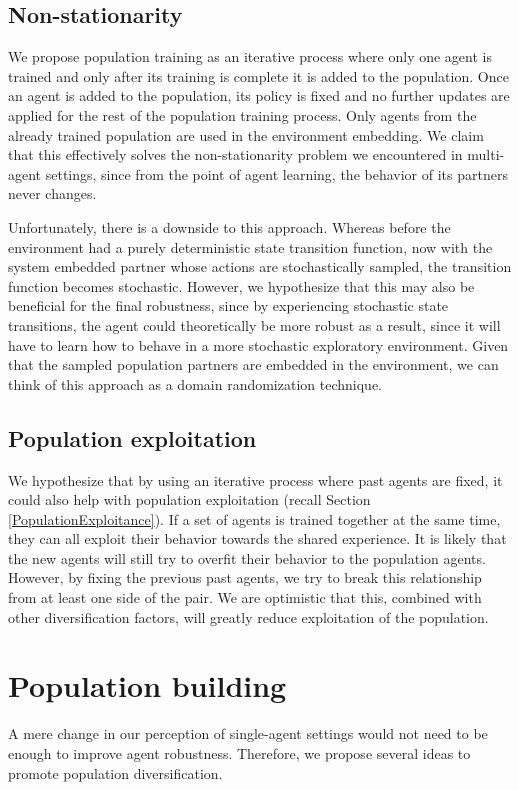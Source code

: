 \subsection{Non-stationarity}
We propose population training as an iterative process where only one agent is trained and only after its training is complete it is added to the population.
Once an agent is added to the population, its policy is fixed and no further updates are applied for the rest of the population training process.
Only agents from the already trained population are used in the environment embedding.
We claim that this effectively solves the non-stationarity problem we encountered in multi-agent settings, since from the point of agent learning, the behavior of its partners never changes.

Unfortunately, there is a downside to this approach.
Whereas before the environment had a purely deterministic state transition function, now with the system embedded partner whose actions are stochastically sampled, the transition function becomes stochastic.
However, we hypothesize that this may also be beneficial for the final robustness, since by experiencing stochastic state transitions, the agent could theoretically be more robust as a result, since it will have to learn how to behave in a more stochastic exploratory environment.
Given that the sampled population partners are embedded in the environment, we can think of this approach as a domain randomization technique.

\subsection{Population exploitation}
We hypothesize that by using an iterative process where past agents are fixed, it could also help with population exploitation (recall Section \ref{PopulationExploitance}).
If a set of agents is trained together at the same time, they can all exploit their behavior towards the shared experience.
It is likely that the new agents will still try to overfit their behavior to the population agents.
However, by fixing the previous past agents, we try to break this relationship from at least one side of the pair.
We are optimistic that this, combined with other diversification factors, will greatly reduce exploitation of the population.


\section{Population building}
A mere change in our perception of single-agent settings would not need to be enough to improve agent robustness.
Therefore, we propose several ideas to promote population diversification.
